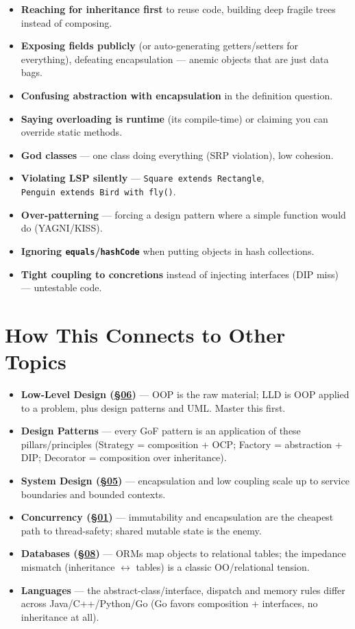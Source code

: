 \documentclass[11pt]{article}
\providecommand{\tightlist}{\setlength{\itemsep}{1pt}\setlength{\parskip}{0pt}}
\begin{document}
\begin{itemize}
\tightlist
\item
  \textbf{Reaching for inheritance first} to reuse code, building deep fragile trees instead of composing.
\item
  \textbf{Exposing fields publicly} (or auto-generating getters/setters for everything), defeating encapsulation --- anemic objects that are just data bags.
\item
  \textbf{Confusing abstraction with encapsulation} in the definition question.
\item
  \textbf{Saying overloading is runtime} (it\textquotesingle s compile-time) or claiming you can override static methods.
\item
  \textbf{God classes} --- one class doing everything (SRP violation), low cohesion.
\item
  \textbf{Violating LSP silently} --- \texttt{Square\ extends\ Rectangle}, \texttt{Penguin\ extends\ Bird\ with\ fly()}.
\item
  \textbf{Over-patterning} --- forcing a design pattern where a simple function would do (YAGNI/KISS).
\item
  \textbf{Ignoring \texttt{equals}/\texttt{hashCode}} when putting objects in hash collections.
\item
  \textbf{Tight coupling to concretions} instead of injecting interfaces (DIP miss) --- untestable code.
\end{itemize}

\section{How This Connects to Other Topics}\label{how-this-connects-to-other-topics}

\begin{itemize}
\tightlist
\item
  \textbf{Low-Level Design (\hyperlink{section.06}{\textcolor{acc}{§06}})} --- OOP is the raw material; LLD is OOP applied to a problem, plus design patterns and UML. Master this first.
\item
  \textbf{Design Patterns} --- every GoF pattern is an application of these pillars/principles (Strategy = composition + OCP; Factory = abstraction + DIP; Decorator = composition over inheritance).
\item
  \textbf{System Design (\hyperlink{section.05}{\textcolor{acc}{§05}})} --- encapsulation and low coupling scale up to service boundaries and bounded contexts.
\item
  \textbf{Concurrency (\hyperlink{section.01}{\textcolor{acc}{§01}})} --- immutability and encapsulation are the cheapest path to thread-safety; shared mutable state is the enemy.
\item
  \textbf{Databases (\hyperlink{section.08}{\textcolor{acc}{§08}})} --- ORMs map objects to relational tables; the impedance mismatch (inheritance \(\leftrightarrow\) tables) is a classic OO/relational tension.
\item
  \textbf{Languages} --- the abstract-class/interface, dispatch and memory rules differ across Java/C++/Python/Go (Go favors composition + interfaces, no inheritance at all).
\end{itemize}
\end{document}
